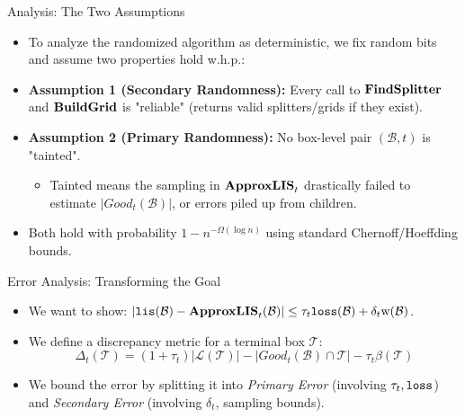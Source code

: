 \documentclass[11pt,aspectratio=169]{beamer}
\newcommand{\lis}{{\tt lis}}
\newcommand{\loss}{{\tt loss}}
\newcommand{\width}{{\bf {\rm  w}}}
\newcommand{\approxlis}{{\rm {\bf ApproxLIS}}}
\newcommand{\findsplitter}{{\rm {\bf FindSplitter}}}
\newcommand{\buildgrid}{{\rm {\bf BuildGrid}}}
\begin{document}
\begin{frame}{Analysis: The Two Assumptions}
    \begin{itemize}
        \item To analyze the randomized algorithm as deterministic, we fix random bits and assume two properties hold w.h.p.:
        \item \textbf{Assumption 1 (Secondary Randomness):} Every call to $\findsplitter$ and $\buildgrid$ is "reliable" (returns valid splitters/grids if they exist).
        \item \textbf{Assumption 2 (Primary Randomness):} No box-level pair $(\mathcal{B}, t)$ is "tainted".
        \begin{itemize}
            \item Tainted means the sampling in $\approxlis_t$ drastically failed to estimate $|Good_t(\mathcal{B})|$, or errors piled up from children.
        \end{itemize}
        \item Both hold with probability $1 - n^{-\Omega(\log n)}$ using standard Chernoff/Hoeffding bounds.
    \end{itemize}
\end{frame}

\begin{frame}{Error Analysis: Transforming the Goal}
    \begin{itemize}
        \item We want to show: $|\lis(\mathcal{B}) - \approxlis_t(\mathcal{B})| \leq \tau_t \loss(\mathcal{B}) + \delta_t \width(\mathcal{B})$.
        \item We define a discrepancy metric for a terminal box $\mathcal{T}$:
        $$\Delta_t(\mathcal{T}) = (1+\tau_t)|\mathcal{L}(\mathcal{T})| - |Good_t(\mathcal{B}) \cap \mathcal{T}| - \tau_t \beta(\mathcal{T})$$
        \item We bound the error by splitting it into \emph{Primary Error} (involving $\tau_t, \loss$) and \emph{Secondary Error} (involving $\delta_t$, sampling bounds).
    \end{itemize}
\end{frame}
\end{document}
